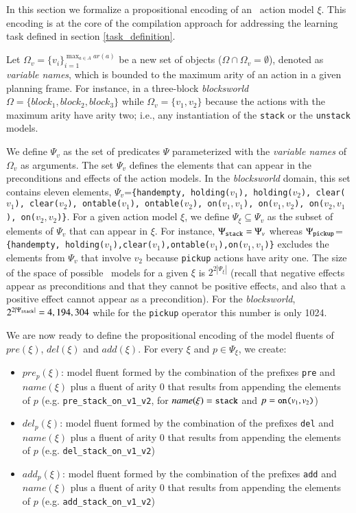 In this section we formalize a propositional encoding of an \strips\ action model $\xi$. This encoding is at the core of the \FAMA compilation approach for addressing the learning task defined in section \ref{task_definition}.

Let $\Omega_v=\{v_i\}_{i=1}^{\operatorname*{max}_{a\in A} ar(a)}$ be a new set of objects ($\Omega\cap\Omega_v=\emptyset$), denoted as {\em variable names}, which is bounded to the maximum arity of an action in a given planning frame. For instance, in a three-block {\em blocksworld} $\Omega=\{block_1, block_2, block_3\}$ while $\Omega_v=\{v_1,v_2\}$ because the actions with the maximum arity have arity two; i.e., any instantiation of the {\small\tt stack} or the {\small\tt unstack} models.

We define $\Psi_v$ as the set of predicates $\Psi$ parameterized with the {\em variable names} of $\Omega_v$ as arguments. The set $\Psi_v$  defines the elements that can appear in the preconditions and effects of the action models. In the {\em blocksworld} domain, this set contains eleven elements, $\Psi_v$={\small\tt\{handempty, holding($v_1$), holding($v_2$), clear($v_1$), clear($v_2$), ontable($v_1$), ontable($v_2$), on($v_1,v_1$), on($v_1,v_2$), on($v_2,v_1$), on($v_2,v_2$)\}}. For a given action model $\xi$, we define $\Psi_{\xi}\subseteq \Psi_v$ as the subset of elements of $\Psi_v$ that can appear in $\xi$. For instance, $\Psi_{\tt stack}=\Psi_v$ whereas $\Psi_{\tt pickup}$={\small\tt\{handempty, holding($v_1$),clear($v_1$),ontable($v_1$),on($v_1,v_1$)\}} excludes the elements from $\Psi_v$ that involve $v_2$ because {\small\tt pickup} actions have arity one. The size of the space of possible \strips\ models for a given $\xi$ is $2^{2|\Psi_{\xi}|}$ (recall that negative effects appear as preconditions and that they cannot be positive effects, and also that a positive effect cannot appear as a precondition). For the {\em blocksworld}, $2^{2|\Psi_{\tt stack}|}=4,194,304$ while for the {\tt pickup} operator this number is only 1024.

We are now ready to define the propositional encoding of the model fluents of $pre(\xi)$, $del(\xi)$ and $add(\xi)$. For every $\xi$ and $p\in \Psi_{\xi}$, we create:

\begin{itemize}
\item $pre_p(\xi)$: model fluent formed by the combination of the prefixes {\small \texttt{pre}} and $name(\xi)$ plus a fluent of arity 0 that results from appending the elements of $p$ (e.g. {\small \texttt{pre\_stack\_on\_v1\_v2}}, for $name(\xi)={\small\texttt{stack}}$ and $p={\small\texttt{on($v_1,v_2$)}}$)
\item $del_p(\xi)$: model fluent formed by the combination of the prefixes {\small \texttt{del}} and $name(\xi)$ plus a fluent of arity 0 that results from appending the elements of $p$ (e.g. {\small  \texttt{del\_stack\_on\_v1\_v2}})
\item $add_p(\xi)$: model fluent formed by the combination of the prefixes {\small \texttt{add}} and $name(\xi)$ plus a fluent of arity 0 that results from appending the elements of $p$ (e.g. {\small \texttt{add\_stack\_on\_v1\_v2}})
\end{itemize}


